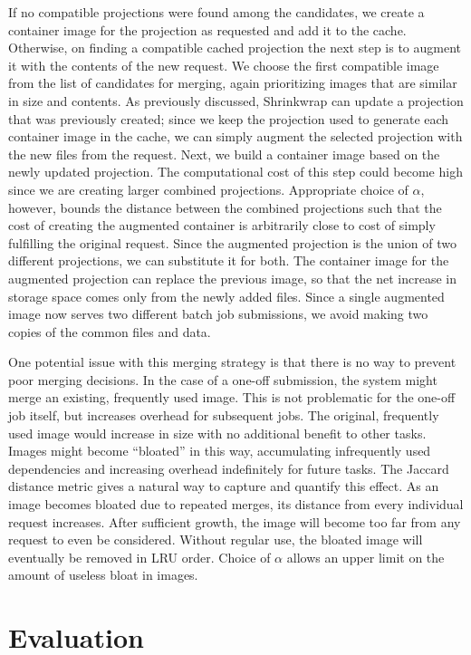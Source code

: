 \documentclass[sigconf]{acmart}
\begin{document}
If no compatible projections were found among the candidates,
we create a container image for the projection as requested and add it to the cache.
Otherwise, on finding a compatible cached projection the next step is to augment it with the contents of the new request.
We choose the first compatible image from the list of candidates for merging,
again prioritizing images that are similar in size and contents.
As previously discussed,
Shrinkwrap can update a projection that was previously created;
since we keep the projection used to generate each container image in the cache,
we can simply augment the selected projection with the new files from the request.
Next, we build a container image based on the newly updated projection.
The computational cost of this step could become high since we are creating larger combined projections.
Appropriate choice of $\alpha$, however,
bounds the distance between the combined projections such that the cost of creating the augmented container is arbitrarily close to cost of simply fulfilling the original request.
Since the augmented projection is the union of two different projections,
we can substitute it for both.
The container image for the augmented projection can replace the previous image,
so that the net increase in storage space comes only from the newly added files.
Since a single augmented image now serves two different batch job submissions,
we avoid making two copies of the common files and data.

One potential issue with this merging strategy is that there is no way to prevent poor merging decisions.
In the case of a one-off submission,
the system might merge an existing, frequently used image.
This is not problematic for the one-off job itself,
but increases overhead for subsequent jobs.
The original, frequently used image would increase in size with no additional benefit to other tasks.
Images might become ``bloated'' in this way,
accumulating infrequently used dependencies and increasing overhead indefinitely for future tasks.
The Jaccard distance metric gives a natural way to capture and quantify this effect.
As an image becomes bloated due to repeated merges,
its distance from every individual request increases.
After sufficient growth,
the image will become too far from any request to even be considered.
Without regular use,
the bloated image will eventually be removed in LRU order.
Choice of $\alpha$ allows an upper limit on the amount of useless bloat in images.

\section{Evaluation}
\end{document}
